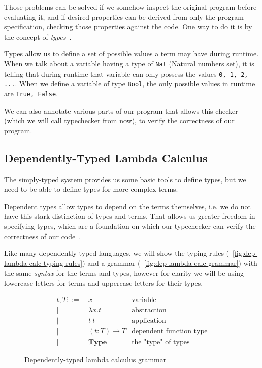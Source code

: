 \documentclass[12pt]{article}
\theoremstyle{definition}
\newcommand{\code}[1]{\texttt{#1}}
\newcommand{\fnarrow}{\rightarrow}
\newcommand{\tylit}{\textbf{Type}}
\begin{document}
Those problems can be solved if we somehow inspect the original program before evaluating it, and if desired properties can be derived from only the program specification, checking those properties against the code. One way to do it is by the concept of \emph{types}~\cite{tapl}.

Types allow us to define a set of possible values a term may have during runtime. When we talk about a variable having a type of \code{Nat} (Natural numbers set), it is telling that during runtime that variable can only possess the values \code{0, 1, 2, ...}. When we define a variable of type \code{Bool}, the only possible values in runtime are \code{True, False}.

We can also annotate various parts of our program that allows this checker (which we will call typechecker from now), to verify the correctness of our program.

\subsection{Dependently-Typed Lambda Calculus}\label{dep-types}

The simply-typed system provides us some basic tools to define types, but we need to be able to define types for more complex terms.

Dependent types allow types to depend on the terms themselves, i.e. we do not have this stark distinction of types and terms. That allows us greater freedom in specifying types, which are a foundation on which our typechecker can verify the correctness of our code~\cite{advancedtapl}.

Like many dependently-typed languages, we will show the typing rules (~\autoref{fig:dep-lambda-calc-typing-rules}) and a grammar (~\autoref{fig:dep-lambda-calc-grammar}) with the same \emph{syntax} for the terms and types, however for clarity we will be using lowercase letters for terms and uppercase letters for their types.

\begin{figure}[H]
       \[
              \begin{aligned}
                     t, T ::= & \ x                  & \text{variable}                \\
                     |        & \  \lambda x.t       & \text{abstraction}             \\
                     |        & \  t\ t              & \text{application}             \\
                     |        & \ (t : T) \fnarrow T & \text{dependent function type} \\
                     |        & \ \tylit             & \text{the "type" of types}
              \end{aligned}
       \]
       \caption{Dependently-typed lambda calculus grammar}
       \label{fig:dep-lambda-calc-grammar}
\end{figure}
\end{document}
